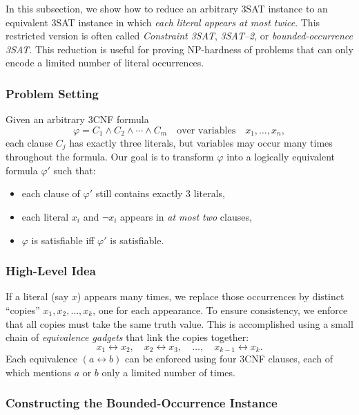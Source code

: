 \documentclass[9pt]{extarticle}
\begin{document}
In this subsection, we show how to reduce an arbitrary 3SAT instance to an
equivalent 3SAT instance in which \emph{each literal appears at most twice}.
This restricted version is often called \emph{Constraint 3SAT}, \emph{3SAT--2},
or \emph{bounded-occurrence 3SAT}. This reduction is useful for proving
NP-hardness of problems that can only encode a limited number of literal
occurrences.

\subsubsection*{Problem Setting}

Given an arbitrary 3CNF formula
\[
\varphi = C_1 \land C_2 \land \cdots \land C_m
\quad\text{over variables}\quad x_1, \dots, x_n,
\]
each clause $C_j$ has exactly three literals, but variables may occur many
times throughout the formula. Our goal is to transform $\varphi$ into a logically
equivalent formula $\varphi'$ such that:
\begin{itemize}
    \item each clause of $\varphi'$ still contains exactly 3 literals,
    \item each literal $x_i$ and $\neg x_i$ appears in \emph{at most two} clauses,
    \item $\varphi$ is satisfiable iff $\varphi'$ is satisfiable.
\end{itemize}

\subsubsection*{High-Level Idea}

If a literal (say $x$) appears many times, we replace those occurrences by
distinct ``copies'' $x_1, x_2, \dots, x_k$, one for each appearance.  
To ensure consistency, we enforce that all copies must take the same truth value.
This is accomplished using a small chain of \emph{equivalence gadgets} that link
the copies together:
\[
x_1 \leftrightarrow x_2, \quad
x_2 \leftrightarrow x_3, \quad \dots,\quad
x_{k-1} \leftrightarrow x_k.
\]
Each equivalence $(a \leftrightarrow b)$ can be enforced using four 3CNF clauses,
each of which mentions $a$ or $b$ only a limited number of times.

\subsubsection*{Constructing the Bounded-Occurrence Instance}
\end{document}
